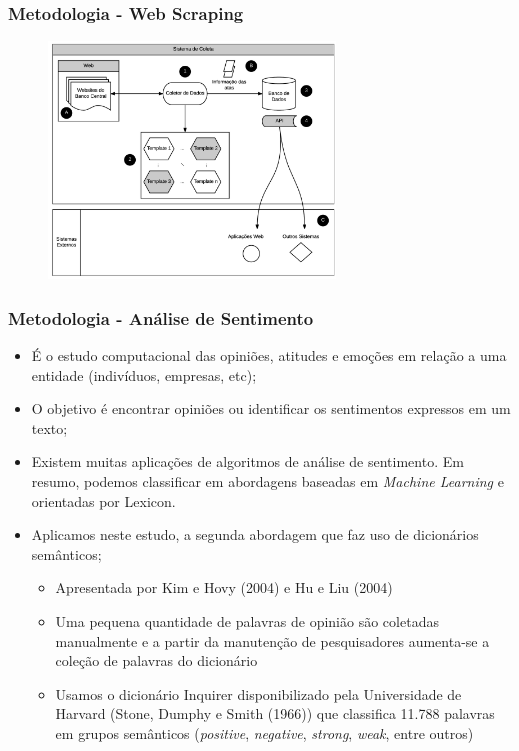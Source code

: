 \documentclass[aspectratio=169]{beamer}
\begin{document}
\begin{frame}\frametitle{Metodologia - Web Scraping}
  \begin{figure}[hb]
  \includegraphics[width=3in]{atas_crawler_diagram.png}
  \label{fig01}
  \end{figure}
\end{frame}

\begin{frame}\frametitle{Metodologia - Análise de Sentimento}
  \begin{itemize}
    \item É o estudo computacional das opiniões, atitudes e emoções em relação a uma entidade (indivíduos, empresas, etc);
    \item O objetivo é encontrar opiniões ou identificar os sentimentos expressos em um texto;
    \item Existem muitas aplicações de algoritmos de análise de sentimento. Em resumo, podemos classificar em abordagens baseadas em \emph{Machine Learning} e orientadas por Lexicon. 
    \item Aplicamos neste estudo, a segunda abordagem que faz uso de dicionários semânticos;
    \begin{itemize}
      \item Apresentada por Kim e Hovy (2004) e Hu e Liu (2004)
      \item Uma pequena quantidade de palavras de opinião são coletadas manualmente e a partir da manutenção de pesquisadores aumenta-se a coleção de palavras do dicionário
      \item Usamos o dicionário Inquirer disponibilizado pela Universidade de Harvard (Stone, Dumphy e Smith (1966)) que classifica 11.788 palavras em grupos semânticos (\emph{positive}, \emph{negative}, \emph{strong}, \emph{weak}, entre outros)
    \end{itemize}
  \end{itemize}
\end{frame}
\end{document}
